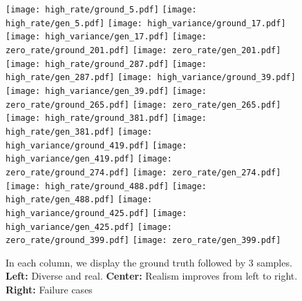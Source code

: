\documentclass{article} \usepackage{iclr2021_conference,times}
\begin{document}
\begin{figure}[htp]
\setlength{\lineskip}{0pt}
  \centering
  \texttt{[image: high\_rate/ground\_5.pdf]}
  \texttt{[image: high\_rate/gen\_5.pdf]} \hfill
  \texttt{[image: high\_variance/ground\_17.pdf]}
  \texttt{[image: high\_variance/gen\_17.pdf]} \hfill
  \texttt{[image: zero\_rate/ground\_201.pdf]}
  \texttt{[image: zero\_rate/gen\_201.pdf]} \\
  \texttt{[image: high\_rate/ground\_287.pdf]}
  \texttt{[image: high\_rate/gen\_287.pdf]} \hfill
  \texttt{[image: high\_variance/ground\_39.pdf]}
  \texttt{[image: high\_variance/gen\_39.pdf]} \hfill
  \texttt{[image: zero\_rate/ground\_265.pdf]}
  \texttt{[image: zero\_rate/gen\_265.pdf]} \\
  \texttt{[image: high\_rate/ground\_381.pdf]}
  \texttt{[image: high\_rate/gen\_381.pdf]} \hfill
  \texttt{[image: high\_variance/ground\_419.pdf]}
  \texttt{[image: high\_variance/gen\_419.pdf]} \hfill
  \texttt{[image: zero\_rate/ground\_274.pdf]}
  \texttt{[image: zero\_rate/gen\_274.pdf]} \\
  \texttt{[image: high\_rate/ground\_488.pdf]}
  \texttt{[image: high\_rate/gen\_488.pdf]} \hfill
  \texttt{[image: high\_variance/ground\_425.pdf]}
  \texttt{[image: high\_variance/gen\_425.pdf]} \hfill
  \texttt{[image: zero\_rate/ground\_399.pdf]}
  \texttt{[image: zero\_rate/gen\_399.pdf]} \\
\caption{In each column, we display the ground truth followed by 3 samples. \textbf{Left:} Diverse and real. \textbf{Center:} Realism improves from left to right. \textbf{Right:} Failure cases}
\label{fig:mturk_v1}
\end{figure}
\end{document}
